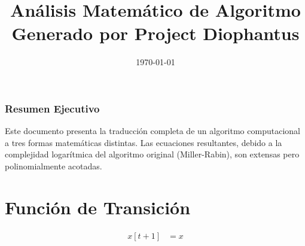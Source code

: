 \documentclass[10pt, a4paper]{article}
\title{Análisis Matemático de Algoritmo \\ \large Generado por Project Diophantus}
\author{}
\date{\today}
\begin{document}
\maketitle
\section*{Resumen Ejecutivo}
Este documento presenta la traducción completa de un algoritmo computacional a tres formas matemáticas distintas.
Las ecuaciones resultantes, debido a la complejidad logarítmica del algoritmo original (Miller-Rabin), son extensas pero polinomialmente acotadas.
\part{Función de Transición}
\begin{align*}
x[t+1] &= x \\

\end{align*}
\end{document}
